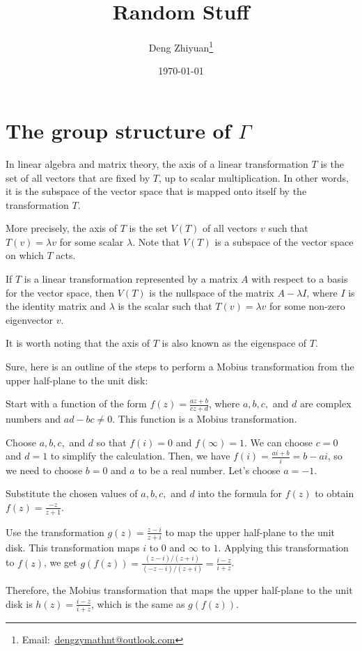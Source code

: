 \documentclass[12pt,a4paper,english]{article}
\title{Random Stuff}
\date{\today}
\author{Deng Zhiyuan\footnote{Email:\ \href{mailto:dengzymathnt@outlook.com}{dengzymathnt@outlook.com}}}
\theoremstyle{plain}
\theoremstyle{definition}
\theoremstyle{remark}
\begin{document}
\maketitle
\newpage
\section{The group structure of $\Gamma$}
In linear algebra and matrix theory, the axis of a linear transformation $T$ is the set of all vectors that are fixed by $T$, up to scalar multiplication. In other words, it is the subspace of the vector space that is mapped onto itself by the transformation $T$.

More precisely, the axis of $T$ is the set $V(T)$ of all vectors $v$ such that $T(v) = \lambda v$ for some scalar $\lambda$. Note that $V(T)$ is a subspace of the vector space on which $T$ acts.

If $T$ is a linear transformation represented by a matrix $A$ with respect to a basis for the vector space, then $V(T)$ is the nullspace of the matrix $A - \lambda I$, where $I$ is the identity matrix and $\lambda$ is the scalar such that $T(v) = \lambda v$ for some non-zero eigenvector $v$.

It is worth noting that the axis of $T$ is also known as the eigenspace of $T$.

Sure, here is an outline of the steps to perform a Mobius transformation from the upper half-plane to the unit disk:

Start with a function of the form $f(z) = \frac{az + b}{cz + d}$, where $a,b,c,$ and $d$ are complex numbers and $ad-bc\neq 0$. This function is a Mobius transformation.

Choose $a,b,c,$ and $d$ so that $f(i) = 0$ and $f(\infty) = 1$. We can choose $c = 0$ and $d = 1$ to simplify the calculation. Then, we have $f(i) = \frac{ai+b}{i} = b - ai$, so we need to choose $b = 0$ and $a$ to be a real number. Let's choose $a = -1$.

Substitute the chosen values of $a,b,c,$ and $d$ into the formula for $f(z)$ to obtain $f(z) = \frac{-z}{z + 1}$.

Use the transformation $g(z) = \frac{z-i}{z+i}$ to map the upper half-plane to the unit disk. This transformation maps $i$ to $0$ and $\infty$ to $1$. Applying this transformation to $f(z)$, we get $g(f(z)) = \frac{(z-i)/(z+i)}{(-z-i)/(z+i)} = \frac{i-z}{i+z}$.

Therefore, the Mobius transformation that maps the upper half-plane to the unit disk is $h(z) = \frac{i-z}{i+z}$, which is the same as $g(f(z))$.
\end{document}
